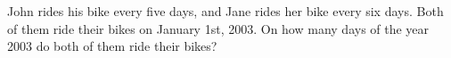 John rides his bike every five days, and Jane rides her bike every six days. Both of them ride their bikes on January 1st, 2003. On how many days of the year 2003 do both of them ride their bikes?
